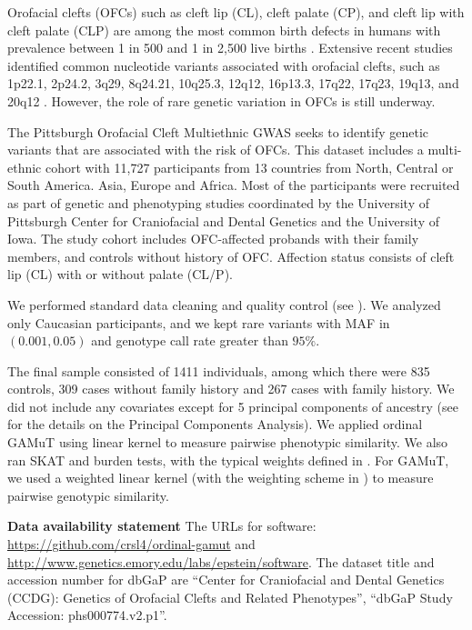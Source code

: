 \documentclass[]{article}
\begin{document}
Orofacial clefts (OFCs) such as cleft lip (CL), cleft palate (CP), and
cleft lip with cleft palate (CLP) are among the most common birth
defects in humans with prevalence between 1 in 500 and 1 in 2,500 live
births \citep{Tessier1976, Mossey2009}. Extensive recent studies
identified common nucleotide variants associated with orofacial clefts,
such as 1p22.1, 2p24.2, 3q29, 8q24.21, 10q25.3, 12q12, 16p13.3, 17q22,
17q23, 19q13, and 20q12
\citep{Birnbaum2009, Grant2009, Beaty2010, Mangold2009, Wolf2015, Leslie2016, Leslie2016b, Mostowska2018}.
However, the role of rare genetic variation in OFCs is still underway.

The Pittsburgh Orofacial Cleft Multiethnic GWAS
\citep{Leslie2016, Leslie2016b} seeks to identify genetic variants that
are associated with the risk of OFCs. This dataset includes a
multi-ethnic cohort with 11,727 participants from 13 countries from
North, Central or South America. Asia, Europe and Africa. Most of the
participants were recruited as part of genetic and phenotyping studies
coordinated by the University of Pittsburgh Center for Craniofacial and
Dental Genetics and the University of Iowa. The study cohort includes
OFC-affected probands with their family members, and controls without
history of OFC. Affection status consists of cleft lip (CL) with or
without palate (CL/P).

We performed standard data cleaning and quality control (see
\citet{Leslie2016}). We analyzed only Caucasian participants, and we
kept rare variants with MAF in \((0.001,0.05)\) and genotype call rate
greater than \(95\%\).

The final sample consisted of 1411 individuals, among which there were
835 controls, 309 cases without family history and 267 cases with family
history. We did not include any covariates except for 5 principal
components of ancestry (see \citet{Leslie2016} for the details on the
Principal Components Analysis). We applied ordinal GAMuT using linear
kernel to measure pairwise phenotypic similarity. We also ran SKAT and
burden tests, with the typical weights defined in \citet{Wu2011}. For
GAMuT, we used a weighted linear kernel (with the weighting scheme in
\citet{Wu2011}) to measure pairwise genotypic similarity.

\textbf{Data availability statement } The URLs for software:
\url{https://github.com/crsl4/ordinal-gamut} and
\url{http://www.genetics.emory.edu/labs/epstein/software}. The dataset
title and accession number for dbGaP are ``Center for Craniofacial and
Dental Genetics (CCDG): Genetics of Orofacial Clefts and Related
Phenotypes'', ``dbGaP Study Accession: phs000774.v2.p1''.
\end{document}
